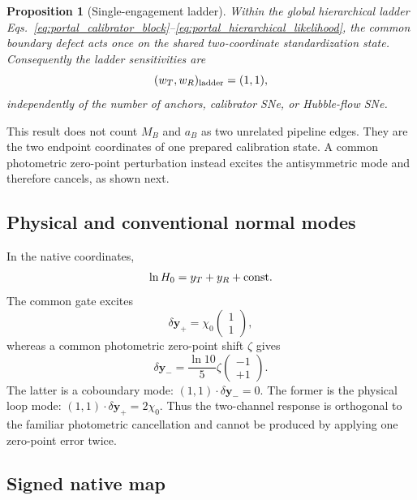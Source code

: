\documentclass[aps,prd,twocolumn,10pt,superscriptaddress,nofootinbib]{revtex4-2}
\newtheorem{proposition}{Proposition}
\begin{document}
\begin{proposition}[Single-engagement ladder]
Within the global hierarchical ladder
Eqs.~\eqref{eq:portal_calibrator_block}--\eqref{eq:portal_hierarchical_likelihood},
the common boundary defect acts once on the shared two-coordinate
standardization state.  Consequently the ladder sensitivities are
\begin{equation}
 (w_T,w_R)_{\rm ladder}=(1,1),
 \label{eq:portal_ladder_weights_derived}
\end{equation}
independently of the number of anchors, calibrator SNe, or Hubble-flow SNe.
\end{proposition}

This result does not count $M_B$ and $a_B$ as two unrelated pipeline edges.
They are the two endpoint coordinates of one prepared calibration state.  A
common photometric zero-point perturbation instead excites the antisymmetric
mode and therefore cancels, as shown next.

\subsection{Physical and conventional normal modes}
\label{sec:portal_normal_modes}

In the native coordinates,
\begin{equation}
 \ln H_0=y_T+y_R+{\rm const.}
 \label{eq:portal_h0_vector}
\end{equation}
The common gate excites
\begin{equation}
 \delta\mathbf y_+=\chi_0
 \begin{pmatrix}1\\1\end{pmatrix},
 \label{eq:portal_common_mode}
\end{equation}
whereas a common photometric zero-point shift $\zeta$ gives
\begin{equation}
 \delta\mathbf y_-=\frac{\ln10}{5}\zeta
 \begin{pmatrix}-1\\+1\end{pmatrix}.
 \label{eq:portal_photometric_mode}
\end{equation}
The latter is a coboundary mode:
$(1,1)\cdot\delta\mathbf y_-=0$.  The former is the physical loop mode:
$(1,1)\cdot\delta\mathbf y_+=2\chi_0$.  Thus the two-channel response is
orthogonal to the familiar photometric cancellation and cannot be produced
by applying one zero-point error twice.

\subsection{Signed native map}
\label{sec:signed_native_map}
\end{document}
